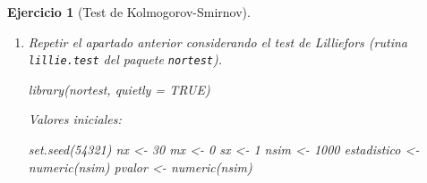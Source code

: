 \documentclass[
]{book}
\newenvironment{Shaded}{\begin{snugshade}}{\end{snugshade}}
\newcommand{\AttributeTok}[1]{\textcolor[rgb]{0.77,0.63,0.00}{#1}}
\newcommand{\CommentTok}[1]{\textcolor[rgb]{0.56,0.35,0.01}{\textit{#1}}}
\newcommand{\ConstantTok}[1]{\textcolor[rgb]{0.00,0.00,0.00}{#1}}
\newcommand{\DecValTok}[1]{\textcolor[rgb]{0.00,0.00,0.81}{#1}}
\newcommand{\FunctionTok}[1]{\textcolor[rgb]{0.00,0.00,0.00}{#1}}
\newcommand{\NormalTok}[1]{#1}
\newcommand{\OtherTok}[1]{\textcolor[rgb]{0.56,0.35,0.01}{#1}}
\newcommand{\StringTok}[1]{\textcolor[rgb]{0.31,0.60,0.02}{#1}}
\theoremstyle{break}
\newtheorem{exercise}{Ejercicio}[chapter]
\theoremstyle{nonumberplain}
\renewcommand{\CommentTok}[1]{\textcolor[rgb]{0.41,0.41,0.41}{\texttt{#1}}}
\begin{document}
\begin{exercise}[Test de Kolmogorov-Smirnov]
\begin{enumerate}
\begin{Shaded}
\begin{Highlighting}[]
\CommentTok{\# Distribución empírica}
\FunctionTok{curve}\NormalTok{(}\FunctionTok{ecdf}\NormalTok{(pvalor)(x), }\AttributeTok{type =} \StringTok{"s"}\NormalTok{, }\AttributeTok{lwd =} \DecValTok{2}\NormalTok{, }
      \AttributeTok{main =} \StringTok{\textquotesingle{}Tamaño del contraste\textquotesingle{}}\NormalTok{, }\AttributeTok{ylab =} \StringTok{\textquotesingle{}Proporción de rechazos\textquotesingle{}}\NormalTok{, }
      \AttributeTok{xlab =} \StringTok{\textquotesingle{}Nivel de significación\textquotesingle{}}\NormalTok{)}
\FunctionTok{abline}\NormalTok{(}\AttributeTok{a=}\DecValTok{0}\NormalTok{, }\AttributeTok{b=}\DecValTok{1}\NormalTok{, }\AttributeTok{lty=}\DecValTok{2}\NormalTok{)   }\CommentTok{\# curve(punif(x, 0, 1), add = TRUE)}
\end{Highlighting}
\end{Shaded}

  \begin{center}\texttt{[image: 07-Monte\_Carlo\_files/figure-latex/unnamed-chunk-47-2]} \end{center}
\item
  Repetir el apartado anterior considerando el test de Lilliefors
  (rutina \texttt{lillie.test} del paquete \texttt{nortest}).

\begin{Shaded}
\begin{Highlighting}[]
\FunctionTok{library}\NormalTok{(nortest, }\AttributeTok{quietly =} \ConstantTok{TRUE}\NormalTok{)}
\end{Highlighting}
\end{Shaded}

  Valores iniciales:

\begin{Shaded}
\begin{Highlighting}[]
\FunctionTok{set.seed}\NormalTok{(}\DecValTok{54321}\NormalTok{)}
\NormalTok{nx }\OtherTok{\textless{}{-}} \DecValTok{30}
\NormalTok{mx }\OtherTok{\textless{}{-}} \DecValTok{0}
\NormalTok{sx }\OtherTok{\textless{}{-}} \DecValTok{1}
\NormalTok{nsim }\OtherTok{\textless{}{-}} \DecValTok{1000}
\NormalTok{estadistico }\OtherTok{\textless{}{-}} \FunctionTok{numeric}\NormalTok{(nsim)}
\NormalTok{pvalor }\OtherTok{\textless{}{-}} \FunctionTok{numeric}\NormalTok{(nsim)}
\end{Highlighting}
\end{Shaded}


\end{enumerate}
\end{exercise}
\end{document}
